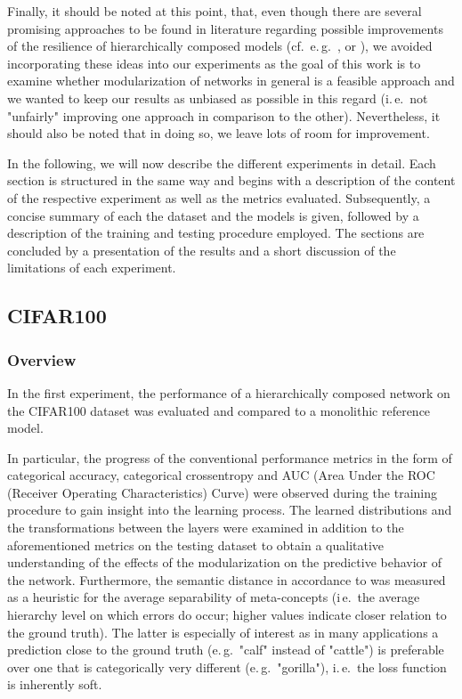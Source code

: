 Finally, it should be noted at this point, that, even though there are several promising approaches to be found in literature regarding possible improvements of the resilience of hierarchically composed models (cf.\ e.\,g.\ \cite{Fergus2010-or}, \cite{Deng2014-so} or \cite{Roy2020-rv}), we avoided incorporating these ideas into our experiments as the goal of this work is to examine whether modularization of networks in general is a feasible approach and we wanted to keep our results as unbiased as possible in this regard (i.\,e.\ not "unfairly" improving one approach in comparison to the other). Nevertheless, it should also be noted that in doing so, we leave lots of room for improvement.

In the following, we will now describe the different experiments in detail. Each section is structured in the same way and begins with a description of the content of the respective experiment as well as the metrics evaluated. Subsequently, a concise summary of each the dataset and the models is given, followed by a description of the training and testing procedure employed. The sections are concluded by a presentation of the results and a short discussion of the limitations of each experiment.

\subsection{CIFAR100%
            \label{sec:experiments_cifar100}}

\subsubsection{Overview%
               \label{sec:experiments_cifar100_overview}}
               
In the first experiment, the performance of a hierarchically composed network on the CIFAR100 dataset was evaluated and compared to a monolithic reference model.

In particular, the progress of the conventional performance metrics in the form of categorical accuracy, categorical crossentropy and AUC (Area Under the ROC (Receiver Operating Characteristics) Curve) were observed during the training procedure to gain insight into the learning process. The learned distributions and the transformations between the layers were examined in addition to the aforementioned metrics on the testing dataset to obtain a qualitative understanding of the effects of the modularization on the predictive behavior of the network. Furthermore, the semantic distance in accordance to \cite{Fergus2010-or} was measured as a heuristic for the average separability of meta-concepts (i\,e.\ the average hierarchy level on which errors do occur; higher values indicate closer relation to the ground truth). The latter is especially of interest as in many applications a prediction close to the ground truth (e.\,g.\ "calf" instead of "cattle") is preferable over one that is categorically very different (e.\,g.\ "gorilla"), i.\,e.\ the loss function is inherently soft.
               
